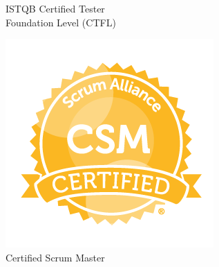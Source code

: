 \documentclass[11pt,a4paper,sans]{moderncv}}
\begin{document}
{\begin{minipage}[t]{0.24\linewidth}
    \scriptsize ISTQB Certified Tester\\
    Foundation Level (CTFL)
  \end{minipage}
  \hfill
  \begin{minipage}[t]{0.24\linewidth}
    \centering
    \includegraphics[width=0.9\linewidth]{../../../images/Certified_Scrum_Master_(CSM)_certification_badge.PNG}\\
    \scriptsize Certified Scrum Master
  \end{minipage}
}
\end{document}
